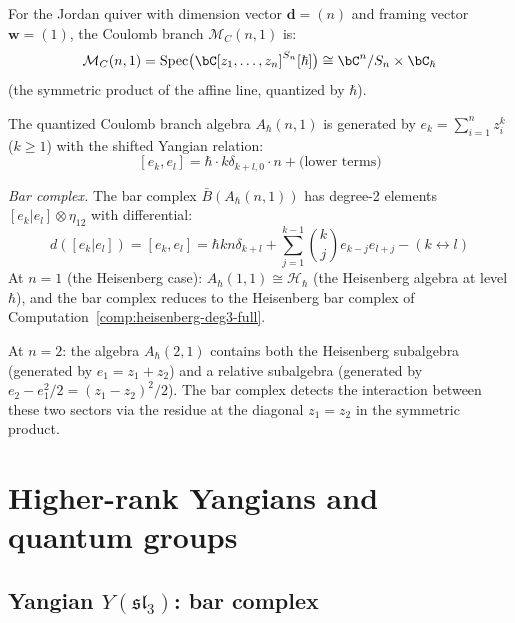 \begin{computation}
\label{comp:coulomb-bar}

For the Jordan quiver with dimension vector $\mathbf{d} = (n)$
and framing vector $\mathbf{w} = (1)$, the Coulomb branch
$\mathcal{M}_C(n, 1)$ is:
\[
\mathcal{M}_C(n, 1)
= \operatorname{Spec}\bigl(
\bC[z_1, \ldots, z_n]^{S_n}[\hbar]\bigr)
\cong \bC^n/S_n \times \bC_\hbar
\]
(the symmetric product of the affine line, quantized by $\hbar$).

The quantized Coulomb branch algebra
$A_\hbar(n, 1)$ is generated by
$e_k = \sum_{i=1}^n z_i^k$ ($k \geq 1$) with
the shifted Yangian relation:
\[
[e_k, e_l] = \hbar \cdot k \delta_{k+l, 0} \cdot n
+ \text{(lower terms)}
\]

\emph{Bar complex.}
The bar complex $\bar{B}(A_\hbar(n,1))$ has degree-2
elements $[e_k | e_l] \otimes \eta_{12}$ with differential:
\[
d([e_k | e_l]) = [e_k, e_l]
= \hbar k n \delta_{k+l} + \sum_{j=1}^{k-1}
\binom{k}{j} e_{k-j} e_{l+j} - (k \leftrightarrow l)
\]
At $n = 1$ (the Heisenberg case): $A_\hbar(1,1) \cong
\mathcal{H}_\hbar$ (the Heisenberg algebra at level $\hbar$),
and the bar complex reduces to the Heisenberg bar complex
of Computation~\ref{comp:heisenberg-deg3-full}.

At $n = 2$: the algebra $A_\hbar(2,1)$ contains both the
Heisenberg subalgebra (generated by $e_1 = z_1 + z_2$) and
a relative subalgebra (generated by $e_2 - e_1^2/2
= (z_1-z_2)^2/2$).  The bar complex detects the interaction
between these two sectors via the residue at the diagonal
$z_1 = z_2$ in the symmetric product.
\end{computation}


\section{Higher-rank Yangians and quantum groups}
\label{sec:higher-rank-yangians}

\subsection{\texorpdfstring{Yangian $Y(\mathfrak{sl}_3)$: bar complex}{Yangian Y(sl3): bar complex}}

